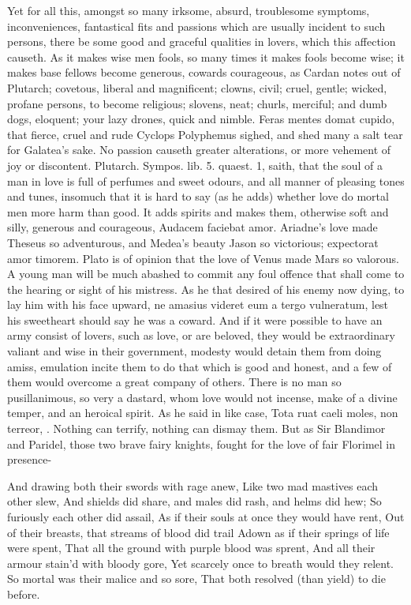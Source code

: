 Yet for all this, amongst so many irksome, absurd, troublesome
symptoms, inconveniences, fantastical fits and passions which are
usually incident to such persons, there be some good and graceful
qualities in lovers, which this affection causeth. As it makes wise men
fools, so many times it makes fools become wise; it makes base
fellows become generous, cowards courageous, as Cardan notes out of
Plutarch; covetous, liberal and magnificent; clowns, civil; cruel,
gentle; wicked, profane persons, to become religious; slovens, neat;
churls, merciful; and dumb dogs, eloquent; your lazy drones, quick and
nimble. Feras mentes domat cupido, that fierce, cruel and rude Cyclops
Polyphemus sighed, and shed many a salt tear for Galatea's sake. No
passion causeth greater alterations, or more vehement of joy or
discontent. Plutarch. Sympos. lib. 5. quaest. 1,  saith, that the
soul of a man in love is full of perfumes and sweet odours, and all
manner of pleasing tones and tunes, insomuch that it is hard to say (as
he adds) whether love do mortal men more harm than good. It adds
spirits and makes them, otherwise soft and silly, generous and
courageous, Audacem faciebat amor. Ariadne's love made Theseus so
adventurous, and Medea's beauty Jason so victorious; expectorat amor
timorem. Plato is of opinion that the love of Venus made Mars so
valorous. A young man will be much abashed to commit any foul offence
that shall come to the hearing or sight of his mistress. As he
that desired of his enemy now dying, to lay him with his face upward,
ne amasius videret eum a tergo vulneratum, lest his sweetheart should
say he was a coward. And if it were possible to have an army
consist of lovers, such as love, or are beloved, they would be
extraordinary valiant and wise in their government, modesty would
detain them from doing amiss, emulation incite them to do that which is
good and honest, and a few of them would overcome a great company of
others. There is no man so pusillanimous, so very a dastard, whom love
would not incense, make of a divine temper, and an heroical spirit. As
he said in like case,  Tota ruat caeli moles, non terreor, \etc{}.
Nothing can terrify, nothing can dismay them. But as Sir Blandimor and
Paridel, those two brave fairy knights, fought for the love of fair
Florimel in presence-

And drawing both their swords with rage anew,
Like two mad mastives each other slew,
And shields did share, and males did rash, and helms did hew;
So furiously each other did assail,
As if their souls at once they would have rent,
Out of their breasts, that streams of blood did trail
Adown as if their springs of life were spent,
That all the ground with purple blood was sprent,
And all their armour stain'd with bloody gore,
Yet scarcely once to breath would they relent.
So mortal was their malice and so sore,
That both resolved (than yield) to die before.

